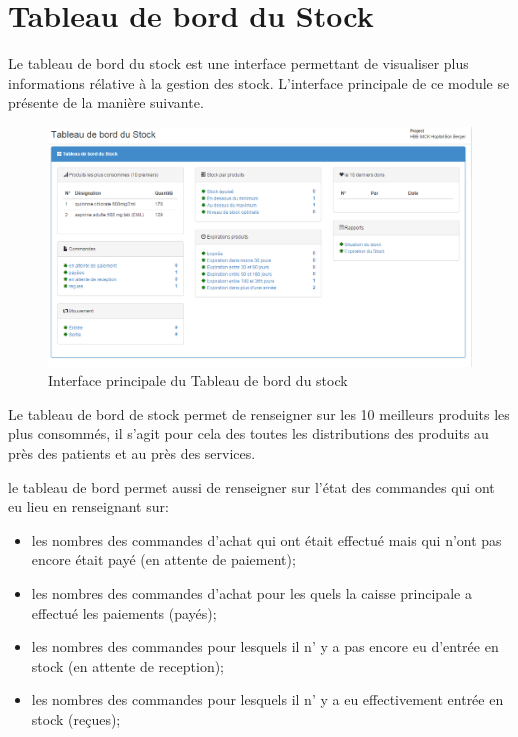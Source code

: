 \documentclass[12pt,a4paper]{report}
\begin{document}
\newpage
\section{Tableau de bord du Stock}
Le tableau de bord du stock est une interface permettant de visualiser plus informations rélative à la gestion des stock. L'interface principale de ce module se présente de la manière suivante.

\begin{figure}[h]
\begin{center}
\includegraphics[width=12cm]{pic/TaBordStock.png}
\end{center}
\caption{Interface principale du Tableau de bord du stock}
\label{Interface principale du Tableau de bord du stock}
\end{figure} 

Le tableau de bord de stock permet de renseigner sur les 10 meilleurs produits les plus consommés, il s'agit pour cela des toutes les distributions des produits au près des patients et au près des services. 

le tableau de bord permet aussi de renseigner sur l'état des commandes qui ont eu lieu en renseignant sur:
\begin{itemize}
\item les nombres des commandes d'achat qui ont était effectué mais qui n'ont pas encore était payé (en attente de paiement);
\item les nombres des commandes d'achat pour les quels la caisse principale a effectué les paiements (payés);
\item les nombres des commandes pour lesquels il n' y a pas encore eu d'entrée en stock (en attente de reception);
\item les nombres des commandes pour lesquels il n' y a eu effectivement entrée en stock (reçues);
\end{itemize}
\end{document}
